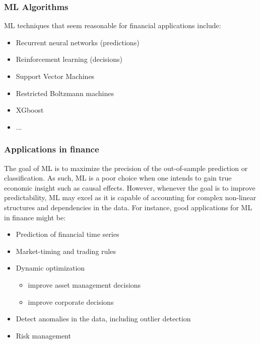 \documentclass[xcolor=dvipsnames, english, 8pt]{beamer}
\begin{document}
\begin{frame}
    \frametitle{ML Algorithms}
ML techniques that seem reasonable for financial applications include:\vspace{0.25cm}\\
\begin{itemize}
    \item Recurrent {\color{ubRed}neural networks} (predictions)
    \item {\color{ubRed} Reinforcement learning} (decisions)
    \item Support Vector Machines
    \item Restricted Boltzmann machines
    \item XGboost
    \item ...
\end{itemize}

\end{frame}

\begin{frame}
    \frametitle{Applications in finance}
The goal of ML is to {\color{ubRed}maximize the precision of the out-of-sample prediction or classification}. As such, ML is a {\color{ubRed}poor choice when one intends to gain true economic insight such as causal effects}. However, whenever the goal is to improve predictability, ML may excel as it is capable of {\color{ubRed}accounting for complex non-linear structures and dependencies} in the data. For instance, good applications for ML in finance might be:\vspace{0.25cm}\\
\begin{itemize}
    \item Prediction of financial time series
    \item Market-timing and trading rules
    \item Dynamic optimization
    \begin{itemize}
    \item improve asset management decisions
    \item improve corporate decisions
\end{itemize}
    \item Detect anomalies in the data, including outlier detection
    \item Risk management
\end{itemize}

\end{frame}
\end{document}
